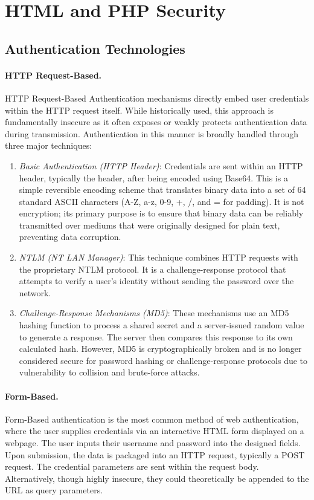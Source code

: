 \section{HTML and PHP Security}

\subsection{Authentication Technologies}

\paragraph{HTTP Request-Based.} HTTP Request-Based Authentication mechanisms directly embed user credentials within the HTTP request itself. While historically used, this approach is fundamentally insecure as it often exposes or weakly protects authentication data during transmission. Authentication in this manner is broadly handled through three major techniques:

\begin{enumerate}
    \item \textit{Basic Authentication (HTTP Header)}: Credentials are sent within an HTTP header, typically the  header, after being encoded using Base64. This is a simple reversible encoding scheme that translates binary data into a set of 64 standard ASCII characters (A-Z, a-z, 0-9, +, /, and = for padding). It is not encryption; its primary purpose is to ensure that binary data can be reliably transmitted over mediums that were originally designed for plain text, preventing data corruption.
    \item \textit{NTLM (NT LAN Manager)}: This technique combines HTTP requests with the proprietary NTLM protocol. It is a challenge-response protocol that attempts to verify a user's identity without sending the password over the network.
    \item \textit{Challenge-Response Mechanisms (MD5)}: These mechanisms use an MD5 hashing function to process a shared secret and a server-issued random value to generate a response. The server then compares this response to its own calculated hash. However, MD5 is cryptographically broken and is no longer considered secure for password hashing or challenge-response protocols due to vulnerability to collision and brute-force attacks.
\end{enumerate}

\paragraph{Form-Based.} Form-Based authentication is the most common method of web authentication, where the user supplies credentials via an interactive HTML form displayed on a webpage. The user inputs their username and password into the designed fields. Upon submission, the data is packaged into an HTTP request, typically a POST request. The credential parameters are sent within the request body. Alternatively, though highly insecure, they could theoretically be appended to the URL as query parameters.

